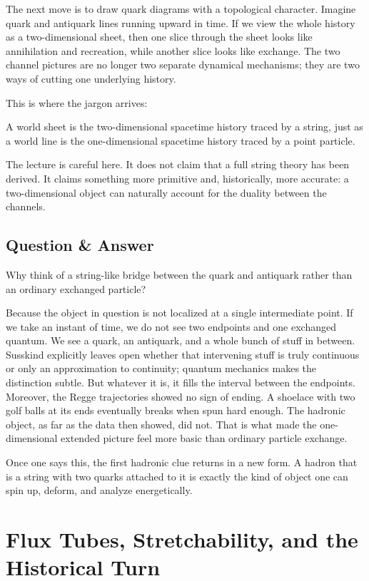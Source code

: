 The next move is to draw quark diagrams with a topological character. Imagine quark and antiquark lines running upward in time. If we view the whole history as a two-dimensional sheet, then one slice through the sheet looks like annihilation and recreation, while another slice looks like exchange. The two channel pictures are no longer two separate dynamical mechanisms; they are two ways of cutting one underlying history.

This is where the jargon arrives:
\begin{definition}
A world sheet is the two-dimensional spacetime history traced by a string, just as a world line is the one-dimensional spacetime history traced by a point particle.
\end{definition}
The lecture is careful here. It does not claim that a full string theory has been derived. It claims something more primitive and, historically, more accurate: a two-dimensional object can naturally account for the duality between the channels.

\subsection{Question \& Answer}

Why think of a string-like bridge between the quark and antiquark rather than an ordinary exchanged particle?

Because the object in question is not localized at a single intermediate point. If we take an instant of time, we do not see two endpoints and one exchanged quantum. We see a quark, an antiquark, and a whole bunch of stuff in between. Susskind explicitly leaves open whether that intervening stuff is truly continuous or only an approximation to continuity; quantum mechanics makes the distinction subtle. But whatever it is, it fills the interval between the endpoints. Moreover, the Regge trajectories showed no sign of ending. A shoelace with two golf balls at its ends eventually breaks when spun hard enough. The hadronic object, as far as the data then showed, did not. That is what made the one-dimensional extended picture feel more basic than ordinary particle exchange.

Once one says this, the first hadronic clue returns in a new form. A hadron that is a string with two quarks attached to it is exactly the kind of object one can spin up, deform, and analyze energetically.

\section{Flux Tubes, Stretchability, and the Historical Turn}

